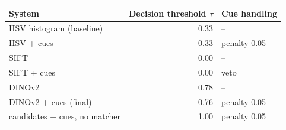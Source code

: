\begin{tabular}{lrl}
\toprule
System & Decision threshold $\tau$ & Cue handling \\
\midrule
HSV histogram (baseline) & 0.33 & -- \\
HSV + cues & 0.33 & penalty 0.05 \\
SIFT & 0.00 & -- \\
SIFT + cues & 0.00 & veto \\
DINOv2 & 0.78 & -- \\
DINOv2 + cues (final) & 0.76 & penalty 0.05 \\
candidates + cues, no matcher & 1.00 & penalty 0.05 \\
\bottomrule
\end{tabular}

